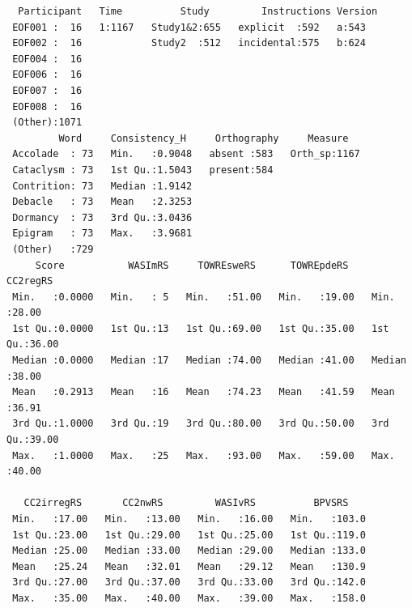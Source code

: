 \documentclass[
  letterpaper,
  DIV=11,
  numbers=noendperiod]{scrreprt}
\begin{document}
\begin{verbatim}
  Participant   Time          Study         Instructions Version
 EOF001 :  16   1:1167   Study1&2:655   explicit  :592   a:543  
 EOF002 :  16            Study2  :512   incidental:575   b:624  
 EOF004 :  16                                                   
 EOF006 :  16                                                   
 EOF007 :  16                                                   
 EOF008 :  16                                                   
 (Other):1071                                                   
         Word     Consistency_H     Orthography     Measure    
 Accolade  : 73   Min.   :0.9048   absent :583   Orth_sp:1167  
 Cataclysm : 73   1st Qu.:1.5043   present:584                 
 Contrition: 73   Median :1.9142                               
 Debacle   : 73   Mean   :2.3253                               
 Dormancy  : 73   3rd Qu.:3.0436                               
 Epigram   : 73   Max.   :3.9681                               
 (Other)   :729                                                
     Score           WASImRS     TOWREsweRS      TOWREpdeRS       CC2regRS    
 Min.   :0.0000   Min.   : 5   Min.   :51.00   Min.   :19.00   Min.   :28.00  
 1st Qu.:0.0000   1st Qu.:13   1st Qu.:69.00   1st Qu.:35.00   1st Qu.:36.00  
 Median :0.0000   Median :17   Median :74.00   Median :41.00   Median :38.00  
 Mean   :0.2913   Mean   :16   Mean   :74.23   Mean   :41.59   Mean   :36.91  
 3rd Qu.:1.0000   3rd Qu.:19   3rd Qu.:80.00   3rd Qu.:50.00   3rd Qu.:39.00  
 Max.   :1.0000   Max.   :25   Max.   :93.00   Max.   :59.00   Max.   :40.00  
                                                                              
   CC2irregRS       CC2nwRS         WASIvRS          BPVSRS     
 Min.   :17.00   Min.   :13.00   Min.   :16.00   Min.   :103.0  
 1st Qu.:23.00   1st Qu.:29.00   1st Qu.:25.00   1st Qu.:119.0  
 Median :25.00   Median :33.00   Median :29.00   Median :133.0  
 Mean   :25.24   Mean   :32.01   Mean   :29.12   Mean   :130.9  
 3rd Qu.:27.00   3rd Qu.:37.00   3rd Qu.:33.00   3rd Qu.:142.0  
 Max.   :35.00   Max.   :40.00   Max.   :39.00   Max.   :158.0  
                                                                

\end{verbatim}
\end{document}
